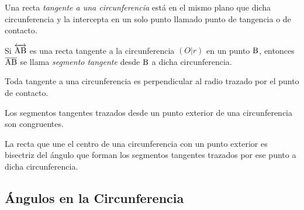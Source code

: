 \begin{definition}
    Una recta \textit{tangente a una circunferencia} está en el mismo plano que dicha circunferencia y la intercepta en un solo punto llamado punto de tangencia o de contacto.

    \begin{figure}[!h]
        \centering
        
        \label{fig:circle-tangent}
    \end{figure}
    
\end{definition}

\begin{definition}
    Si $\overleftrightarrow{\rm AB}$ es una recta tangente a la circunferencia $(O|r)$ en un punto $\rm B$, entonces $\overline{\rm AB}$ se llama \textit{segmento tangente} desde $\rm B$ a dicha circunferencia. 
\end{definition}

\begin{theorem}
    Toda tangente a una circunferencia es perpendicular al radio trazado por el punto de contacto.

    \begin{figure}[!h]
        \centering
        
        \label{fig:theorem27}
    \end{figure}
    
\end{theorem}

\begin{theorem}
    Los segmentos tangentes trazados desde un punto exterior de una circunferencia son congruentes.
\end{theorem}

\begin{theorem}
    La recta que une el centro de una circunferencia con un punto exterior es bisectriz del ángulo que forman los segmentos tangentes trazados por ese punto a dicha circunferencia.
\end{theorem}

\begin{figure}[!h]
    \centering
    
    \label{fig:theorem28}
\end{figure}

\clearpage

\subsection{Ángulos en la Circunferencia}

